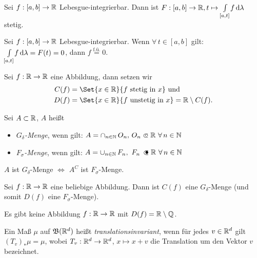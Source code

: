 \documentclass{cheat-sheet}
\newcommand{\Bor}{\mathfrak{B}} %
\newcommand{\fue}{\overset{\text{f.ü.}}} %
\begin{document}
\begin{satz}
  Sei $f : [a, b] \to \mathbb{R}$ Lebesgue-integrierbar. Dann ist $F : [a, b] \to \mathbb{R}, t \mapsto {\textstyle \int\limits_{[a, t]}^{}} f \,\mathrm{d} \lambda$ stetig.
\end{satz}

\begin{satz}
  Sei $f : [a, b] \to \mathbb{R}$ Lebesgue-integrierbar. Wenn $\forall \, t \in [a, b]$ gilt: ${\textstyle \int\limits_{[a, t]}^{}} f \,\mathrm{d} \lambda = F(t) = 0$, dann $f \fue= 0$.
\end{satz}

\begin{nota}
  Sei $f : \mathbb{R} \to \mathbb{R}$ eine Abbildung, dann setzen wir
  \begin{align*}
    C(f) &= \Set{ x \in \R }{ f \text{ stetig in } x } \text{ und}\\
    D(f) &= \Set{ x \in \R }{ f \text{ unstetig in } x } = \R \setminus C(f).
  \end{align*}
\end{nota}

\begin{defn}
  Sei $A \subset \mathbb{R}$, $A$ heißt
  \begin{itemize}
    \item \emph{$G_{\delta}$-Menge}, wenn gilt: $A = \cap_{n \in \N}\,O_n, \, O_n \opn \R\ \forall\,n \in \N$
    \item \emph{$F_{\sigma}$-Menge}, wenn gilt: $A = \cup_{n \in \N}\,F_n, \,\, F_n \, \cls \R\ \forall\,n \in \N$
  \end{itemize}
\end{defn}

\begin{bem}
  $A $ ist $G_\delta$-Menge $\iff$ $A^C$ ist $F_\sigma$-Menge.
\end{bem}

\begin{satz}[Young]
  Sei $f : \mathbb{R} \to \mathbb{R}$ eine beliebige Abbildung. Dann ist $C(f)$ eine $G_\delta$-Menge (und somit $D(f)$ eine $F_\sigma$-Menge).
\end{satz}

\begin{kor}
  Es gibt keine Abbildung $f : \mathbb{R} \to \mathbb{R}$ mit $D(f) = \mathbb{R} \setminus \mathbb{Q}$.
\end{kor}

\begin{defn}
  Ein Maß $\mu$ auf $\Bor(\R^d)$ heißt \emph{translationsinvariant}, wenn für jedes $v \in \mathbb{R}^d$ gilt $(T_v)_* \mu = \mu$, wobei $T_v : \mathbb{R}^d \to \mathbb{R}^d$, $x \mapsto x + v$ die Translation um den Vektor $v$ bezeichnet.
\end{defn}
\end{document}

